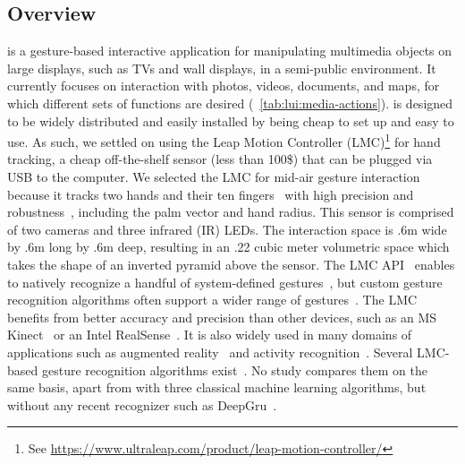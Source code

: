 \subsection{Overview} \label{sec:lui:description:overview}
\lui is a gesture-based interactive application for manipulating multimedia objects on large displays, such as TVs and wall displays, in a semi-public environment.
It currently focuses on interaction with photos, videos, documents, and maps, for which different sets of functions are desired (\tab~\ref{tab:lui:media-actions}). \lui is designed to be widely distributed and easily installed by being cheap to set up and easy to use. As such, we settled on using the Leap Motion Controller (LMC)\footnote{See \url{https://www.ultraleap.com/product/leap-motion-controller/}} for hand tracking, a cheap off-the-shelf sensor (less than 100\$) that can be plugged via USB to the computer. We selected the LMC for mid-air gesture interaction because it tracks two hands and their ten fingers~\cite{Colgan:2017} with high precision and robustness~\cite{Weichert:2013}, including the palm vector and hand radius. This sensor is comprised of two cameras and three infrared (IR) LEDs. The interaction space is .6m wide by .6m long by .6m deep, resulting in an .22 cubic meter volumetric space which takes the shape of an inverted pyramid above the sensor.
The LMC API~\cite{Spiegelmock:2013} enables to natively recognize a handful of system-defined gestures~\cite{Brandon:2014}, but custom gesture recognition algorithms often support a wider range of gestures~\cite{Bachmann:2018}. The LMC benefits from better accuracy and precision than other devices, such as an MS Kinect~\cite{Guzsvinecz:2019} or an Intel RealSense~\cite{Khalaf:2019}.
It is also widely used in many domains of applications such as augmented reality~\cite{Lopez:2015} and activity recognition~\cite{Marin:2016}. Several LMC-based gesture recognition algorithms exist~\cite{Bachmann:2018}. No study compares them on the same basis, apart from \cite{Filho:2018} with three classical machine learning algorithms, but without any recent recognizer such as DeepGru~\cite{Maghoumi:2019}.

